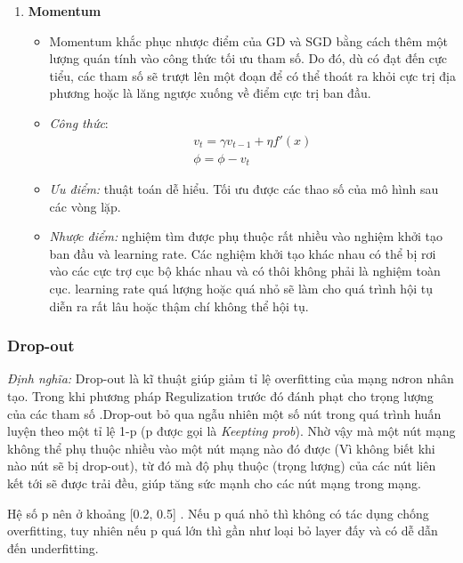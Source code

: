 \begin{enumerate}
	\item \textbf{Momentum}
	\begin{itemize}
		\item Momentum khắc phục nhược điểm của GD và SGD bằng cách thêm một lượng quán tính vào công thức tối ưu tham số. Do đó, dù có đạt đến cực tiểu, các tham số sẽ trượt lên một đoạn để có thể thoát ra khỏi cực trị địa phương hoặc là lăng ngược xuống về điểm cực trị ban đầu.
		\item \textit{Công thức}:
		\begin{align} 
			v_t = \gamma v_{t-1} + \eta f'(x)\\
			\phi = \phi - v_t
		\end{align}
		\item \textit{Ưu điểm: }thuật toán dễ hiểu. Tối ưu được các thao số của mô hình sau các vòng lặp.
		\item \textit{Nhược điểm: }nghiệm tìm được phụ thuộc rất nhiều vào nghiệm khởi tạo ban đầu và learning rate. Các nghiệm khởi tạo khác nhau có thể bị rơi vào các cực trợ cục bộ khác nhau và có thôi không phải là nghiệm toàn cục. learning rate quá lượng hoặc quá nhỏ sẽ làm cho quá trình hội tụ diễn ra rất lâu hoặc thậm chí không thể hội tụ. 
	\end{itemize}
\end{enumerate}

\subsubsection{Drop-out}
\textit{Định nghĩa:} Drop-out là kĩ thuật giúp giảm tỉ lệ overfitting của mạng nơron nhân tạo. Trong khi phương pháp Regulization trước đó đánh phạt cho trọng lượng của các tham số .Drop-out bỏ qua ngẫu nhiên một số nút trong quá trình huấn luyện theo một tỉ lệ 1-p (p được gọi là \textit{Keepting prob}). Nhờ vậy mà một nút mạng không thể phụ thuộc nhiều vào một nút mạng nào đó được (Vì không biết khi nào nút sẽ bị drop-out), từ đó mà độ phụ thuộc (trọng lượng) của các nút liên kết tới sẽ được trải đều, giúp tăng sức mạnh cho các nút mạng trong mạng. 

Hệ số p nên ở khoảng [0.2, 0.5] . Nếu p quá nhỏ thì không có tác dụng chống overfitting, tuy nhiên nếu p quá lớn thì gần như loại bỏ layer đấy và có dễ dẫn đến underfitting.

